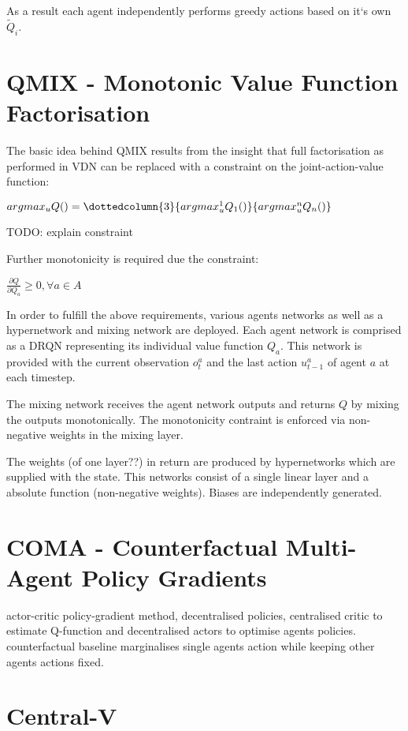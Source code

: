 As a result each agent independently performs greedy actions based on it`s own $ \tilde{Q}_i $.
%
%
%

\section{QMIX - Monotonic Value Function Factorisation}
The basic idea behind QMIX results from the insight that full factorisation as performed in VDN can be replaced with a constraint on the joint-action-value function:

\begin{center}
	$ argmax_u Q() = \dottedcolumn{3}{argmax_u^1 Q_1()}{argmax_u^n Q_n()}$
\end{center}
TODO: explain constraint

Further monotonicity is required due the constraint:

\begin{center}
	$ \frac{\partial Q}{\partial Q_a} \geq 0, \forall a \in A$
\end{center}

In order to fulfill the above requirements, various agents networks as well as a hypernetwork and mixing network are deployed.
Each agent network is comprised as a DRQN representing its individual value function $Q_a$. This network is provided with the current observation $o_t^a$ and the last action $u_{t-1}^a$ of agent $a$ at each timestep.

The mixing network receives the agent network outputs and returns $Q$ by mixing the outputs monotonically. The monotonicity contraint is enforced via non-negative weights in the mixing layer.

The weights (of one layer??) in return are produced by hypernetworks which are supplied with the state. This networks consist of a single linear layer and a absolute function (non-negative weights). Biases are independently generated.

%
%
%
\section{COMA - Counterfactual Multi-Agent Policy Gradients}

actor-critic policy-gradient method, decentralised policies, centralised critic to estimate Q-function and decentralised actors to optimise agents policies. counterfactual baseline marginalises single agents action while keeping other agents actions fixed.
%
%
%
\section{Central-V}
%
%
%
